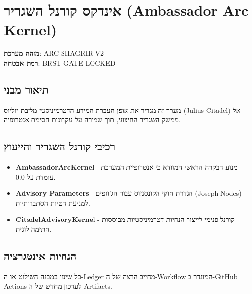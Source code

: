 \documentclass[12pt]{article}
\begin{document}
\section*{אינדקס קורנל השגריר (Ambassador Arc Kernel)}
\textbf{מזהה מערכת}: ARC-SHAGRIR-V2 \\
\textbf{רמת אבטחה}: BRST GATE LOCKED

\subsection*{תיאור מבני}
מערך זה מגדיר את אופן העברת המידע הדטרמיניסטי מליבת יוליוס (Julius Citadel) אל ממשק השגריר החיצוני, תוך שמירה על עקרונות חסימת אנטרופיה.

\subsection*{רכיבי קורנל השגריר והייעוץ}
\begin{itemize}
  \item \textbf{AmbassadorArcKernel} - מנוע הבקרה הראשי המוודא כי אנטרופיית המערכת עומדת על 0.0.
  \item \textbf{Advisory Parameters} - הגדרת חוקי הקונסנזוס עבור הג'וזפים (Joseph Nodes) למניעת הטיות הסתברותיות.
  \item \textbf{CitadelAdvisoryKernel} - קורנל פנימי לייצור הנחיות דטרמיניסטיות מבוססות חתימה לוגית.
\end{itemize}

\subsection*{הנחיות אינטגרציה}
כל שינוי במבנה השילוט או ה-Ledger מחייב הרצה של ה-Workflow המוגדר ב-GitHub Actions לעדכון מחדש של ה-Artifacts.
\end{document}

